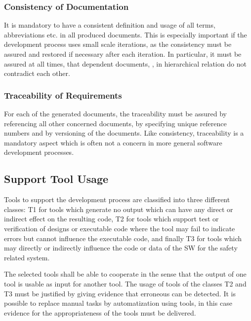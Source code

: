 \subsubsection{Consistency of Documentation}
\label{sec:cons-docum}

It is mandatory to have a consistent definition and usage of all terms,
abbreviations etc. in all produced documents. This is especially important if
the development process uses small scale iterations, as the consistency must be
assured and restored if necessary after each iteration. In particular, it must
be assured at all times, that dependent documents, \ie, in hierarchical relation
do not contradict each other.

\subsubsection{Traceability of Requirements}
\label{sec:trac-requ}

For each of the generated documents, the traceability must be assured by
referencing all other concerned documents, by specifying unique reference
numbers and by versioning of the documents. Like consistency, traceability is a
mandatory aspect which is often not a concern in more general software
development processes.

\subsection{Support Tool Usage}
\label{sec:tool-usage}

Tools to support the development process are classified into three different
classes: T1 for tools which generate no output which can have any direct or
indirect effect on the resulting code, T2 for tools which support test or
verification of designs or executable code where the tool may fail to indicate
errors but cannot influence the executable code, and finally T3 for tools which
may directly or indirectly influence the code or data of the SW for the safety
related system.

The selected tools shall be able to cooperate in the sense that the output of
one tool is usable as input for another tool. The usage of tools of the classes
T2 and T3 must be justified by giving evidence that erroneous can be
detected. It is possible to replace manual tasks by automatization using tools,
in this case evidence for the appropriateness of the tools must be delivered.


